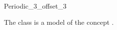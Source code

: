 


\begin{ccRefClass}{Periodic_3_offset_3}

\ccDefinition
The class  is a model of the concept
. 


\ccIsModel {}

\end{ccRefClass}